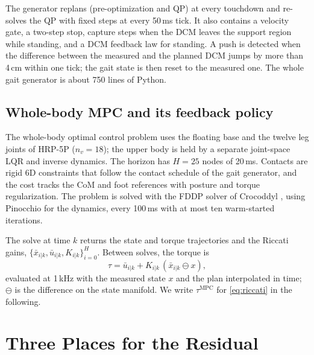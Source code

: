 \documentclass[conference]{IEEEtran}
\newcommand{\mpc}{\mathrm{MPC}}
\newcommand{\xb}{\bar{x}}
\newcommand{\ub}{\bar{u}}
\begin{document}
The generator replans (pre-optimization and QP) at every touchdown and re-solves the QP with fixed steps at every 50\,ms tick.
It also contains a velocity gate, a two-step stop, capture steps when the DCM leaves the support region while standing, and a DCM feedback law for standing.
A push is detected when the difference between the measured and the planned DCM jumps by more than 4\,cm within one tick; the gait state is then reset to the measured one.
The whole gait generator is about 750 lines of Python.

\subsection{Whole-body MPC and its feedback policy}
\label{sec:wb}
The whole-body optimal control problem uses the floating base and the twelve leg joints of HRP-5P ($n_v=18$); the upper body is held by a separate joint-space LQR and inverse dynamics.
The horizon has $H=25$ nodes of 20\,ms.
Contacts are rigid 6D constraints that follow the contact schedule of the gait generator, and the cost tracks the CoM and foot references with posture and torque regularization.
The problem is solved with the FDDP solver of Crocoddyl \cite{mastalli2020crocoddyl}, using Pinocchio \cite{carpentier2019pinocchio} for the dynamics, every 100\,ms with at most ten warm-started iterations.

The solve at time $k$ returns the state and torque trajectories and the Riccati gains, $\{\xb_{i|k},\ub_{i|k},K_{i|k}\}_{i=0}^{H}$.
Between solves, the torque is
\begin{equation}
\tau=\ub_{i|k}+K_{i|k}\,(\xb_{i|k}\ominus x),
\label{eq:riccati}
\end{equation}
evaluated at 1\,kHz with the measured state $x$ and the plan interpolated in time; $\ominus$ is the difference on the state manifold.
We write $\tau^{\mpc}$ for \eqref{eq:riccati} in the following.

\section{Three Places for the Residual}
\label{sec:residual}
\end{document}
